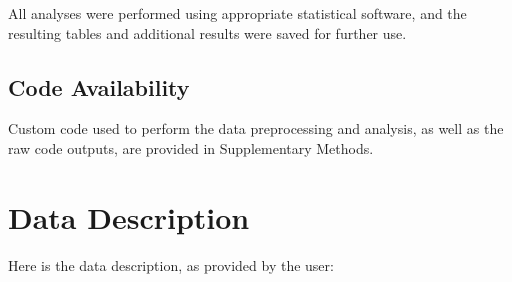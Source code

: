 \documentclass[11pt]{article}
\begin{document}
All analyses were performed using appropriate statistical software, and the resulting tables and additional results were saved for further use.\subsection*{Code Availability}

Custom code used to perform the data preprocessing and analysis, as well as the raw code outputs, are provided in Supplementary Methods.


\clearpage
\appendix

\section{Data Description} \label{sec:data_description} Here is the data description, as provided by the user:
\end{document}

